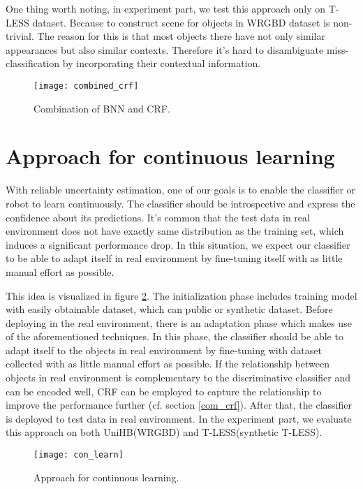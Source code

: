  One thing worth noting, in experiment part, we test this approach only on T-LESS dataset. Because to construct scene for objects in WRGBD dataset is non-trivial. The reason for this is that most objects there have not only similar appearances but also similar contexts. Therefore it's hard to disambiguate miss-classification by incorporating their contextual information.
\begin{figure}[H]
	\begin{center}
		\texttt{[image: combined\_crf]}
		\caption{Combination of BNN and CRF.}		
		\label{fig:combined_crf}
	\end{center}
\end{figure}
\section{Approach for continuous learning}
With reliable uncertainty estimation, one of our goals is to enable the classifier or robot to learn continuously. The classifier should be introspective and express the confidence about its predictions. It's common that the test data in real environment does not have exactly same distribution as the training set, which induces a significant performance drop. In this situation, we expect our classifier to be able to adapt itself in real environment by fine-tuning itself with as little manual effort as possible. 

This idea is visualized in figure \ref{fig:con_learn}. The initialization phase includes training model with easily obtainable dataset, which can public or synthetic dataset. Before deploying in the real environment, there is an adaptation phase which makes use of the aforementioned techniques. In this phase, the classifier should be able to adapt itself to the objects in real environment by fine-tuning with dataset collected with as little manual effort as possible. If the relationship between objects in real environment is complementary to the discriminative classifier and can be encoded well, CRF can be employed to capture the relationship to improve the performance further (cf. section \ref{com_crf}). After that, the classifier is deployed to test data in real environment. In the experiment part, we evaluate this approach on both UniHB(WRGBD) and T-LESS(synthetic T-LESS).
\begin{figure}[H]
	\begin{center}
		\texttt{[image: con\_learn]}
		\caption{Approach for continuous learning.}		
		\label{fig:con_learn}
	\end{center}
\end{figure}
